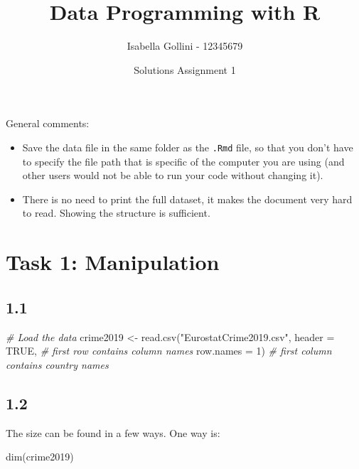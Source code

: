\documentclass[
]{article}
\title{Data Programming with R}
\author{Isabella Gollini - 12345679}
\date{Solutions Assignment 1}
\newenvironment{Shaded}{\begin{snugshade}}{\end{snugshade}}
\newcommand{\AttributeTok}[1]{\textcolor[rgb]{0.77,0.63,0.00}{#1}}
\newcommand{\CommentTok}[1]{\textcolor[rgb]{0.56,0.35,0.01}{\textit{#1}}}
\newcommand{\ConstantTok}[1]{\textcolor[rgb]{0.00,0.00,0.00}{#1}}
\newcommand{\DecValTok}[1]{\textcolor[rgb]{0.00,0.00,0.81}{#1}}
\newcommand{\FunctionTok}[1]{\textcolor[rgb]{0.00,0.00,0.00}{#1}}
\newcommand{\NormalTok}[1]{#1}
\newcommand{\OtherTok}[1]{\textcolor[rgb]{0.56,0.35,0.01}{#1}}
\newcommand{\StringTok}[1]{\textcolor[rgb]{0.31,0.60,0.02}{#1}}
\begin{document}
\maketitle

General comments:

\begin{itemize}
\item
  Save the data file in the same folder as the \texttt{.Rmd} file, so
  that you don't have to specify the file path that is specific of the
  computer you are using (and other users would not be able to run your
  code without changing it).
\item
  There is no need to print the full dataset, it makes the document very
  hard to read. Showing the structure is sufficient.
\end{itemize}

\hypertarget{task-1-manipulation}{%
\section{Task 1: Manipulation}\label{task-1-manipulation}}

\hypertarget{section}{%
\subsection{1.1}\label{section}}

\begin{Shaded}
\begin{Highlighting}[]
\CommentTok{\# Load the data}
\NormalTok{crime2019 }\OtherTok{\textless{}{-}} \FunctionTok{read.csv}\NormalTok{(}\StringTok{"EurostatCrime2019.csv"}\NormalTok{, }
  \AttributeTok{header =} \ConstantTok{TRUE}\NormalTok{, }\CommentTok{\# first row contains column names}
  \AttributeTok{row.names =} \DecValTok{1}\NormalTok{) }\CommentTok{\# first column contains country names}
\end{Highlighting}
\end{Shaded}

\hypertarget{section-1}{%
\subsection{1.2}\label{section-1}}

The size can be found in a few ways. One way is:

\begin{Shaded}
\begin{Highlighting}[]
\FunctionTok{dim}\NormalTok{(crime2019)}
\end{Highlighting}
\end{Shaded}
\end{document}
